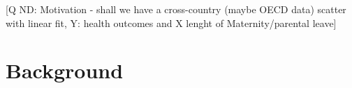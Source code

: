 \documentclass[11pt, a4paper]{article} %
\begin{document}
[Q ND: Motivation - shall we have a cross-country (maybe OECD data) scatter with linear fit, Y: health outcomes and X lenght of Maternity/parental leave]





\newpage
\section{Background}\label{sec:background}
\end{document}
